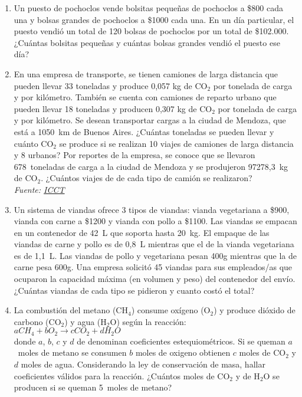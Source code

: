 \documentclass[a4paper]{article}
\begin{document}
\begin{enumerate}
\begin{enumerate} [label=(\alph*)]
		\item Un puesto de pochoclos vende bolsitas pequeñas de pochoclos a \$800 cada una y bolsas grandes de pochoclos a \$1000 cada una. En un día particular, el puesto vendió un total de 120 bolsas de pochoclos por un total de \$102.000. ¿Cuántas bolsitas pequeñas y cuántas bolsas grandes vendió el puesto ese día?
		\item En una empresa de transporte, se tienen camiones de larga distancia que pueden llevar 33 toneladas y produce 0,057 kg de CO$_2$ por tonelada de carga y por kilómetro. También se cuenta con camiones de reparto urbano que pueden llevar 18 toneladas y producen 0,307 kg de CO$_2$ por tonelada de carga y por kilómetro. Se desean transportar cargas a la ciudad de Mendoza, que está a 1050~km de Buenos Aires. ¿Cuántas toneladas se pueden llevar y cuánto CO$_2$ se produce si se realizan 10 viajes de camiones de larga distancia y 8 urbanos? Por reportes de la empresa, se conoce que se llevaron 678~toneladas de carga a la ciudad de Mendoza y se produjeron 97278,3~kg de CO$_2$. ¿Cuántos viajes de de cada tipo de camión se realizaron? \\ \textit{Fuente: \href{https://theicct.org/publication/co2-emissions-from-trucks-in-the-eu-an-analysis-of-the-heavy-duty-co2-standards-baseline-data/}{ICCT}}
		\item Un sistema de viandas ofrece 3 tipos de viandas: vianda vegetariana a \$900, vianda con carne a \$1200 y vianda con pollo a \$1100.  Las viandas se empacan en un contenedor de 42~L que soporta hasta 20~kg. El empaque de las viandas de carne y pollo es de 0,8~L mientras que el de la vianda vegetariana es de 1,1~L. Las viandas de pollo y vegetariana pesan 400g mientras que la de carne pesa 600g. Una empresa solicitó 45 viandas para sus empleados/as que ocuparon la capacidad máxima (en volumen y peso) del contenedor del envío. ¿Cuántas viandas de cada tipo se pidieron y cuanto costó el total?
		\item La combustión del metano (CH$_4$) consume oxígeno (O$_2$) y produce dióxido de carbono (CO$_2$) y agua (H$_2$O) según la reacción: \\ \phantom{-------------------------------------------------}$ aCH_4 + bO_2 \to cCO_2 + d H_{2}O$ \\ donde $a$, $b$, $c$ y $d$ de denominan coeficientes estequiométricos. Si se queman $a$~moles de metano se consumen $b$ moles de oxigeno obtienen $c$ moles de CO$_2$ y $d$ moles de agua. Considerando la ley de conservación de masa, hallar coeficientes válidos para la reacción. ¿Cuántos moles de CO$_2$ y de H$_2$O se producen si se queman 5~moles de metano? 
	\end{enumerate}
\end{enumerate}
\end{document}
